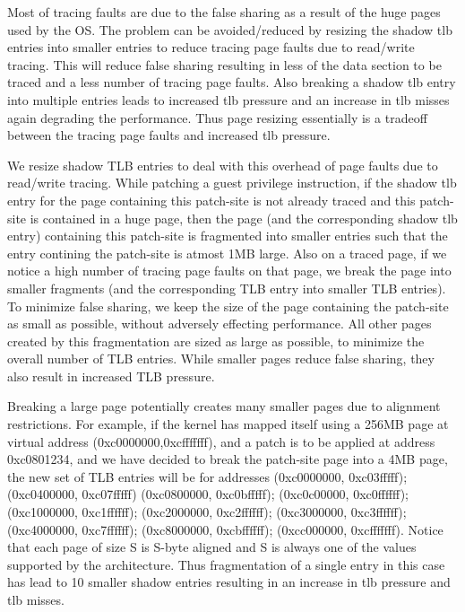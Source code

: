 Most of tracing faults are due to the false sharing as a result of the huge pages used by the OS. The problem can be avoided/reduced by resizing the shadow tlb entries into smaller entries to reduce tracing page faults due to read/write tracing. This will reduce false sharing resulting in less of the data section to be traced and a less number of tracing page faults. Also breaking a shadow tlb entry into multiple entries leads to increased tlb pressure and an increase in tlb misses again degrading the performance. Thus page resizing essentially is a tradeoff between the tracing page faults and increased tlb pressure.

We resize shadow TLB entries to deal with this overhead of page faults due to read/write tracing. While patching a guest privilege instruction, if the shadow tlb entry for the page containing this patch-site is not already traced and this patch-site is contained in a huge page, then the page (and the corresponding shadow tlb entry) containing this patch-site is fragmented into smaller entries such that the entry contining the patch-site is atmost 1MB large. Also on a traced page, if we notice a high number of tracing page faults on that page, we break the page into smaller fragments (and the corresponding TLB entry into smaller TLB entries). To minimize false sharing, we keep the size of the page containing the patch-site as small as possible, without adversely effecting performance. All other pages created by this fragmentation are sized as large as possible, to minimize the overall number of TLB entries. While smaller pages reduce false sharing, they also result in increased TLB pressure.

Breaking a large page potentially creates many smaller pages due to alignment restrictions. For example, if the kernel has mapped itself using a 256MB page at virtual address (0xc0000000,0xcfffffff), and a patch is to be applied at address 0xc0801234, and we have decided to break the patch-site page into a 4MB page, the new set of TLB entries will be for addresses (0xc0000000, 0xc03fffff); (0xc0400000, 0xc07fffff) (0xc0800000, 0xc0bfffff); (0xc0c00000, 0xc0ffffff); (0xc1000000, 0xc1ffffff); (0xc2000000, 0xc2ffffff); (0xc3000000, 0xc3ffffff); (0xc4000000, 0xc7ffffff); (0xc8000000, 0xcbffffff); (0xcc000000, 0xcfffffff). Notice that each page of size S is S-byte aligned and S is always one of the values supported by the architecture. Thus fragmentation of a single entry in this case has lead to 10 smaller shadow entries resulting in an increase in tlb pressure and tlb misses.

